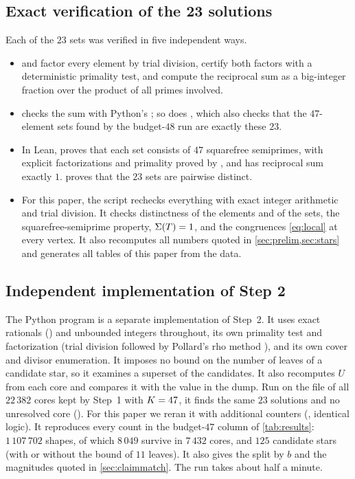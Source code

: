 \documentclass[11pt]{article}
\begin{document}
\subsection{Exact verification of the 23 solutions}\label{sec:exact}

Each of the $23$ sets was verified in five independent ways.
\begin{itemize}
\item {} and  factor every element by trial division, certify both factors with a deterministic primality test, and compute the reciprocal sum as a big-integer fraction over the product of all primes involved.
\item {} checks the sum with Python's ; so does , which also checks that the $47$-element sets found by the budget-$48$ run are exactly these $23$.
\item In Lean,  proves that each set consists of $47$ squarefree semiprimes, with explicit factorizations and primality proved by , and has reciprocal sum exactly $1$.  proves that the $23$ sets are pairwise distinct.
\item For this paper, the script  rechecks everything with exact integer arithmetic and trial division. It checks distinctness of the elements and of the sets, the squarefree-semiprime property, $\Sigma(T)=1$, and the congruences \eqref{eq:local} at every vertex. It also recomputes all numbers quoted in \cref{sec:prelim,sec:stars} and generates all tables of this paper from the data.
\end{itemize}

\subsection{Independent implementation of Step 2}\label{sec:python}

The Python program  is a separate implementation of Step~2. It uses exact rationals () and unbounded integers throughout, its own primality test and factorization (trial division followed by Pollard's rho method \cite{Pollard1975}), and its own cover and divisor enumeration.
It imposes no bound on the number of leaves of a candidate star, so it examines a superset of the candidates. It also recomputes $U$ from each core and compares it with the value in the dump.
Run on the file  of all $22\,382$ cores kept by Step~1 with $K=47$, it finds the same $23$ solutions and no unresolved core ().
For this paper we reran it with additional counters (, identical logic). It reproduces every count in the budget-$47$ column of \cref{tab:results}: $1\,107\,702$ shapes, of which $8\,049$ survive in $7\,432$ cores, and $125$ candidate stars (with or without the bound of $11$ leaves). It also gives the split by $b$ and the magnitudes quoted in \cref{sec:claimmatch}. The run takes about half a minute.
\end{document}
